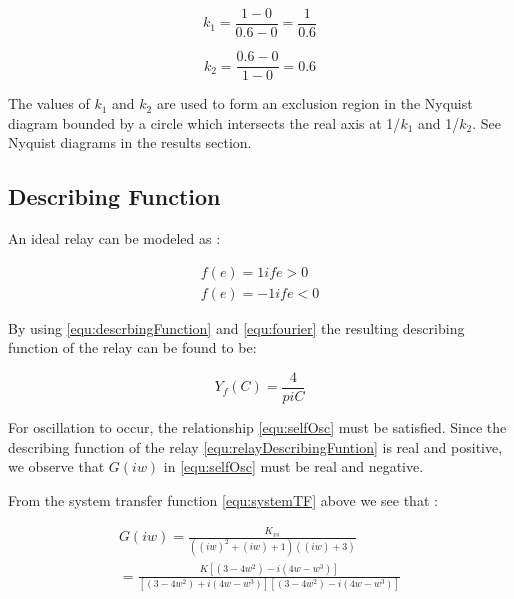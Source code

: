 \documentclass[a4paper, titlepage]{article}
\begin{document}
\begin{equation}
k_{1} = \frac{1-0}{0.6-0} = \frac{1}{0.6}
\label{equ:k1_value}
\end{equation}

\begin{equation}
k_{2} = \frac{0.6-0}{1-0} = 0.6
\label{equ:k2_value}
\end{equation}

The values of $k_{1}$ and $k_{2}$ are used to form an exclusion region in the Nyquist diagram bounded by a circle which intersects the real axis at 1/$k_{1}$ and 1/$k_{2}$.  See Nyquist diagrams in the results section.

\subsection{Describing Function}

An ideal relay can be modeled as \citep[p. 358]{glad00}:

\begin{equation}
\begin{split}
f(e) = 1 if e > 0 \\
f(e) = -1 if e <0
\end{split}
\label{equ:relay}
\end{equation}

By using \ref{equ:descrbingFunction} and \ref{equ:fourier} the resulting describing function of the relay can be found to be:

\begin{equation}
Y_{f}(C) = \frac{4}{piC}
\label{equ:relayDescribingFuntion}
\end{equation}

For oscillation to occur, the relationship \ref{equ:selfOsc} must be satisfied.  Since the describing function of the relay \ref{equ:relayDescribingFuntion} is real and positive, we observe that $G(iw)$ in \ref{equ:selfOsc} must be real and negative.

From the system transfer function \ref{equ:systemTF} above we see that :

\begin{equation}
\begin{split}
G(iw) = \frac{K_{vs}}{((iw)^2+(iw)+1)((iw)+3)}\\
= \frac{K[(3-4w^2)-i(4w-w^3)]}{[(3-4w^2)+i(4w-w^3)][(3-4w^2)-i(4w-w^3)]}
\end{split}
\label{equ:systemTFiw}
\end{equation}
\end{document}
